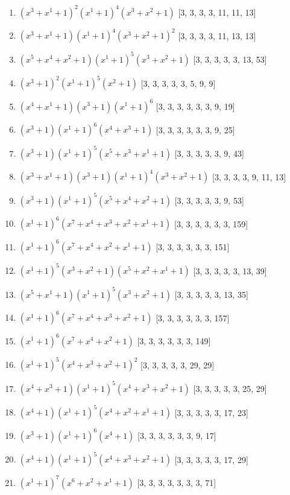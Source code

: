 \documentclass[10pt,twocolumn]{article}
\begin{document}
\begin{enumerate}
\item $(x^{3} + x^{1} + 1)^{2}(x^{1} + 1)^{4}(x^{3} + x^{2} + 1)$  [3, 3, 3, 3, 11, 11, 13]
\item $(x^{3} + x^{1} + 1)(x^{1} + 1)^{4}(x^{3} + x^{2} + 1)^{2}$  [3, 3, 3, 3, 11, 13, 13]
\item $(x^{5} + x^{4} + x^{2} + 1)(x^{1} + 1)^{5}(x^{3} + x^{2} + 1)$  [3, 3, 3, 3, 3, 13, 53]
\item $(x^{3} + 1)^{2}(x^{1} + 1)^{5}(x^{2} + 1)$  [3, 3, 3, 3, 3, 5, 9, 9]
\item $(x^{4} + x^{1} + 1)(x^{3} + 1)(x^{1} + 1)^{6}$  [3, 3, 3, 3, 3, 3, 9, 19]
\item $(x^{3} + 1)(x^{1} + 1)^{6}(x^{4} + x^{3} + 1)$  [3, 3, 3, 3, 3, 3, 9, 25]
\item $(x^{3} + 1)(x^{1} + 1)^{5}(x^{5} + x^{3} + x^{1} + 1)$  [3, 3, 3, 3, 3, 9, 43]
\item $(x^{3} + x^{1} + 1)(x^{3} + 1)(x^{1} + 1)^{4}(x^{3} + x^{2} + 1)$  [3, 3, 3, 3, 9, 11, 13]
\item $(x^{3} + 1)(x^{1} + 1)^{5}(x^{5} + x^{4} + x^{2} + 1)$  [3, 3, 3, 3, 3, 9, 53]
\item $(x^{1} + 1)^{6}(x^{7} + x^{4} + x^{3} + x^{2} + x^{1} + 1)$  [3, 3, 3, 3, 3, 3, 159]
\item $(x^{1} + 1)^{6}(x^{7} + x^{4} + x^{2} + x^{1} + 1)$  [3, 3, 3, 3, 3, 3, 151]
\item $(x^{1} + 1)^{5}(x^{3} + x^{2} + 1)(x^{5} + x^{2} + x^{1} + 1)$  [3, 3, 3, 3, 3, 13, 39]
\item $(x^{5} + x^{1} + 1)(x^{1} + 1)^{5}(x^{3} + x^{2} + 1)$  [3, 3, 3, 3, 3, 13, 35]
\item $(x^{1} + 1)^{6}(x^{7} + x^{4} + x^{3} + x^{2} + 1)$  [3, 3, 3, 3, 3, 3, 157]
\item $(x^{1} + 1)^{6}(x^{7} + x^{4} + x^{2} + 1)$  [3, 3, 3, 3, 3, 3, 149]
\item $(x^{1} + 1)^{5}(x^{4} + x^{3} + x^{2} + 1)^{2}$  [3, 3, 3, 3, 3, 29, 29]
\item $(x^{4} + x^{3} + 1)(x^{1} + 1)^{5}(x^{4} + x^{3} + x^{2} + 1)$  [3, 3, 3, 3, 3, 25, 29]
\item $(x^{4} + 1)(x^{1} + 1)^{5}(x^{4} + x^{2} + x^{1} + 1)$  [3, 3, 3, 3, 3, 17, 23]
\item $(x^{3} + 1)(x^{1} + 1)^{6}(x^{4} + 1)$  [3, 3, 3, 3, 3, 3, 9, 17]
\item $(x^{4} + 1)(x^{1} + 1)^{5}(x^{4} + x^{3} + x^{2} + 1)$  [3, 3, 3, 3, 3, 17, 29]
\item $(x^{1} + 1)^{7}(x^{6} + x^{2} + x^{1} + 1)$  [3, 3, 3, 3, 3, 3, 3, 71]

\end{enumerate}
\end{document}
